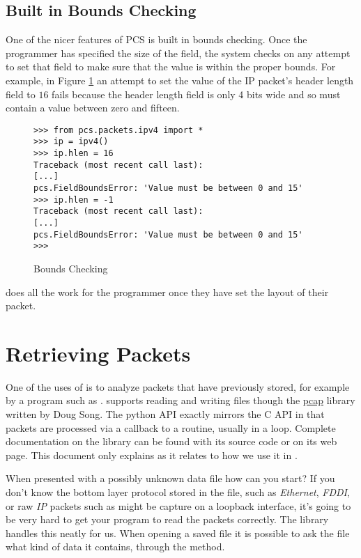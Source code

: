 \documentclass[11pt]{article}
\begin{document}
\subsection{Built in Bounds Checking}
\label{sec:built-in-bounds-checking}

One of the nicer features of PCS is built in bounds checking.  Once
the programmer has specified the size of the field, the system checks
on any attempt to set that field to make sure that the value is within
the proper bounds.  For example, in Figure \ref{fig:bounds-checking-1}
an attempt to set the value of the IP packet's header length field to
$16$ fails because the header length field is only 4 bits wide and so
must contain a value between zero and fifteen.

\begin{figure}
  \centering
\begin{verbatim}
>>> from pcs.packets.ipv4 import *
>>> ip = ipv4()
>>> ip.hlen = 16
Traceback (most recent call last):
[...]
pcs.FieldBoundsError: 'Value must be between 0 and 15'
>>> ip.hlen = -1
Traceback (most recent call last):
[...]
pcs.FieldBoundsError: 'Value must be between 0 and 15'
>>> 
\end{verbatim}
  \caption{Bounds Checking}
  \label{fig:bounds-checking-1}
\end{figure}

 does all the work for the programmer once they have set
the layout of their packet.

\section{Retrieving Packets}
\label{sec:retrieving-packets}

One of the uses of  is to analyze packets that have
previously stored, for example by a program such as
.   supports reading and writing
 files though the
\href{http://monkey.org/~dugsong/pypcap/}{pcap} library written by
Doug Song.  The python API exactly mirrors the C API in that packets
are processed via a callback to a  routine, usually
in a loop.  Complete documentation on the  library can
be found with its source code or on its web page.  This document only
explains  as it relates to how we use it in
.

When presented with a possibly unknown data file how can you start?
If you don't know the bottom layer protocol stored in the file, such
as \emph{Ethernet}, \emph{FDDI}, or raw \emph{IP} packets such as
might be capture on a loopback interface, it's going to be very hard
to get your program to read the packets correctly.  The 
library handles this neatly for us.  When opening a saved file it is
possible to ask the file what kind of data it contains, through the
 method.
\end{document}
